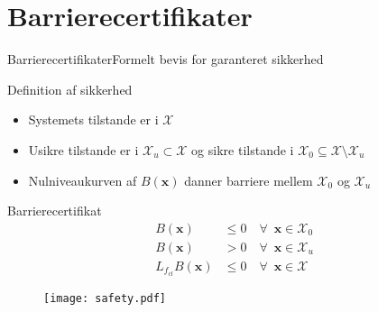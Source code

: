 \section{Barrierecertifikater}
\begin{frame}{Barrierecertifikater}{Formelt bevis for garanteret sikkerhed}
\vspace{2mm}
\begin{block}{Definition af sikkerhed}
	\begin{itemize}
		\item Systemets tilstande er i $\mathcal{X}$
		\item Usikre tilstande er i $\mathcal{X}_u\subset\mathcal{X}$ og sikre tilstande i $\mathcal{X}_0\subseteq\mathcal{X}\setminus\mathcal{X}_u$
		\item Nulniveaukurven af $B(\textbf{x})$ danner  barriere mellem $\mathcal{X}_0$ og $\mathcal{X}_u$
	\end{itemize}
\end{block}
\begin{minipage}[b]{0.4\linewidth}
	\vspace{5mm}
	\begin{block}{Barrierecertifikat}
		\vspace{-5mm}
	\begin{align*}
	B(\mathbf{x})&\leq 0 \quad \forall\,\,\,\mathbf{x}\in\mathcal{X}_0\\
	B(\mathbf{x})&> 0 \quad \forall\,\,\,\mathbf{x}\in\mathcal{X}_u\\
	L_{f_{cl}}B(\mathbf{x})&\leq 0 \quad \forall\,\,\,\mathbf{x}\in\mathcal{X}
	\end{align*}
\end{block}
\end{minipage}
\hspace{2mm}
\begin{minipage}[b]{0.55\linewidth}
\begin{figure}[h]
	\centering
	\texttt{[image: safety.pdf]}
\end{figure}
\end{minipage}
\end{frame}

